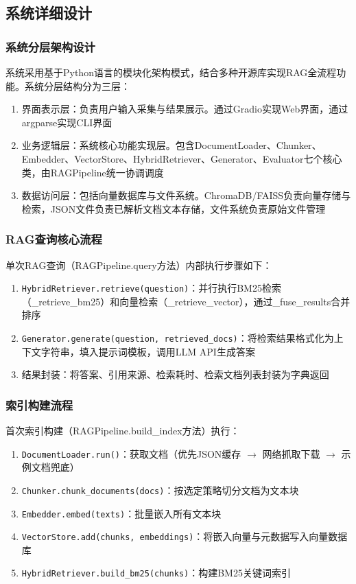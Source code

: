 \documentclass[10pt,a4paper]{article}
\begin{document}
\subsection{系统详细设计}

\subsubsection{系统分层架构设计}

系统采用基于Python语言的模块化架构模式，结合多种开源库实现RAG全流程功能。系统分层结构分为三层：

\begin{enumerate}[label=(\arabic*)]
\item 界面表示层：负责用户输入采集与结果展示。通过Gradio实现Web界面，通过argparse实现CLI界面
\item 业务逻辑层：系统核心功能实现层。包含DocumentLoader、Chunker、Embedder、VectorStore、HybridRetriever、Generator、Evaluator七个核心类，由RAGPipeline统一协调调度
\item 数据访问层：包括向量数据库与文件系统。ChromaDB/FAISS负责向量存储与检索，JSON文件负责已解析文档文本存储，文件系统负责原始文件管理
\end{enumerate}

\subsubsection{RAG查询核心流程}

单次RAG查询（RAGPipeline.query方法）内部执行步骤如下：
\begin{enumerate}[label=(\arabic*)]
\item \texttt{HybridRetriever.retrieve(question)}：并行执行BM25检索（\_retrieve\_bm25）和向量检索（\_retrieve\_vector），通过\_fuse\_results合并排序
\item \texttt{Generator.generate(question, retrieved\_docs)}：将检索结果格式化为上下文字符串，填入提示词模板，调用LLM API生成答案
\item 结果封装：将答案、引用来源、检索耗时、检索文档列表封装为字典返回
\end{enumerate}

\subsubsection{索引构建流程}

首次索引构建（RAGPipeline.build\_index方法）执行：
\begin{enumerate}[label=(\arabic*)]
\item \texttt{DocumentLoader.run()}：获取文档（优先JSON缓存 $\to$ 网络抓取下载 $\to$ 示例文档兜底）
\item \texttt{Chunker.chunk\_documents(docs)}：按选定策略切分文档为文本块
\item \texttt{Embedder.embed(texts)}：批量嵌入所有文本块
\item \texttt{VectorStore.add(chunks, embeddings)}：将嵌入向量与元数据写入向量数据库
\item \texttt{HybridRetriever.build\_bm25(chunks)}：构建BM25关键词索引
\end{enumerate}
\end{document}
